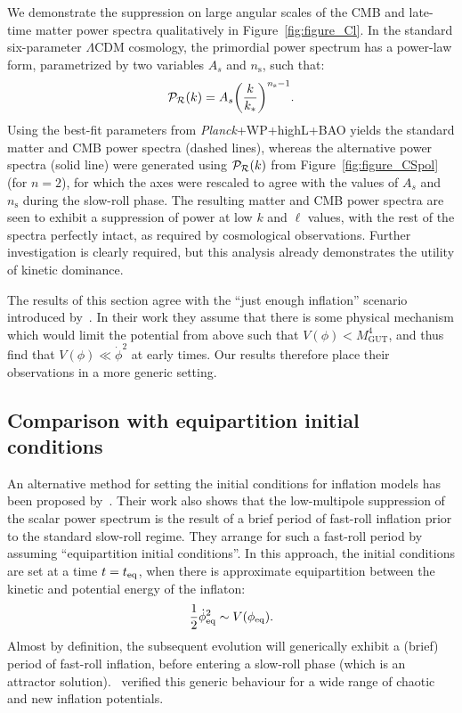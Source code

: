 We demonstrate the suppression on large angular scales of the CMB and late-time matter power spectra qualitatively in Figure~\ref{fig:figure_Cl}.  In the standard six-parameter \(\Lambda\)CDM cosmology, the primordial power spectrum has a power-law form, parametrized by two variables \(A_s\) and \(n_\mathrm{s}\), such that:
\begin{equation}
  \mathcal{P}_{\mathcal{R}}(k) = A_s{\left(\frac{k}{k_*}\right)}^{n_\mathrm{s}-1}.
\end{equation}
Using the best-fit parameters from {\em Planck\/}+WP+highL+BAO \citep{planck_collaboration_planck_2013} yields the standard matter and CMB power spectra (dashed lines), whereas the alternative power spectra (solid line) were generated using \(\mathcal{P}_{\mathcal{R}}(k)\) from Figure~\ref{fig:figure_CSpol} (for \(n=2\)), for which the axes were rescaled to agree with the values of \(A_s\) and \(n_\mathrm{s}\) during the slow-roll phase. The resulting matter and CMB power spectra are seen to exhibit a suppression of power at low \(k\) and \(\ell\) values, with the rest of the spectra perfectly intact, as required by cosmological observations.  Further investigation is clearly required, but this analysis already demonstrates the utility of kinetic dominance.

The results of this section agree with the ``just enough inflation'' scenario introduced by~\cite{Ramirez_excluded_2009,Ramirez_predictions_2012,Ramirez_low_2012}.  In their work they assume that there is some physical mechanism which would limit the potential from above such that \(V(\phi)<M_\mathrm{GUT}^4\), and thus find that \(V(\phi)\ll\dot{\phi}^2\) at early times. Our results therefore place their observations in a more generic setting.


\subsection{Comparison with equipartition initial conditions}
\label{sec:comparison}

An alternative method for setting the initial conditions for inflation models has been proposed by~\cite{boyanovsky_cmb_2006}. Their work also shows that the low-multipole suppression of the scalar power spectrum is the result of a brief period of fast-roll inflation prior to the standard slow-roll regime. They arrange for such a fast-roll period by assuming ``equipartition initial conditions''. In this approach, the initial conditions are set at a time \(t=t_{\mathrm{eq}}\), when there is approximate equipartition between the kinetic and potential energy of the inflaton:
\begin{equation}
  \frac{1}{2}\dot{\phi}_{\mathrm{eq}}^2 \sim V(\phi_{\mathrm{eq}}).
  \label{eqn:bvsbc}
\end{equation}
Almost by definition, the subsequent evolution will generically exhibit a (brief) period of fast-roll inflation, before entering a slow-roll phase (which is an attractor solution).~\cite{boyanovsky_cmb_2006} verified this generic behaviour for a wide range of chaotic and new inflation potentials.

